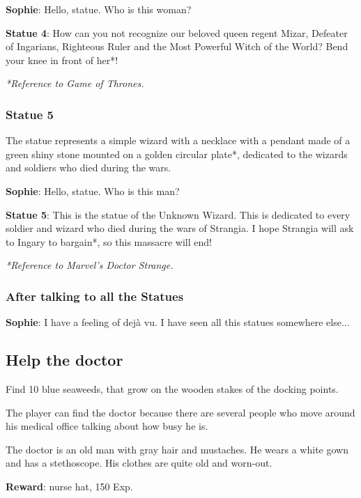 \textbf{Sophie}: Hello, statue. Who is this woman?

\textbf{Statue 4}: How can you not recognize our beloved queen regent Mizar, Defeater of Ingarians, Righteous Ruler and the Most Powerful Witch of the World? Bend your knee in front of her*!

\textit{*Reference to Game of Thrones\texttrademark{}.}

\subsubsection*{Statue 5}
The statue represents a simple wizard with a necklace with a pendant made of a green shiny stone mounted on a golden circular plate*, dedicated to the wizards and soldiers who died during the wars.

\textbf{Sophie}: Hello, statue. Who is this man?

\textbf{Statue 5}: This is the statue of the Unknown Wizard. This is dedicated to every soldier and wizard who died during the wars of Strangia. I hope Strangia will ask to Ingary to bargain*, so this massacre will end!

\textit{*Reference to Marvel\texttrademark 's Doctor Strange.}

\subsubsection*{After talking to all the Statues}
\textbf{Sophie}: I have a feeling of dejà vu. I have seen all this statues somewhere else...


\subsection{Help the doctor}
Find 10 blue seaweeds, that grow on the wooden stakes of the docking points.

The player can find the doctor because there are several people who move around his medical office talking about how busy he is.

The doctor is an old man with gray hair and mustaches. He wears a white gown and has a stethoscope. His clothes are quite old and worn-out.

\textbf{Reward}: nurse hat, 150 Exp.

